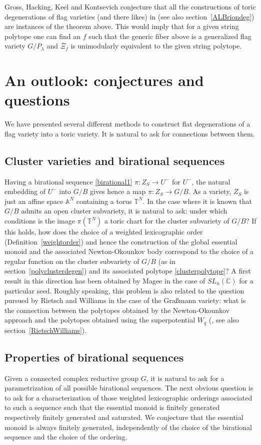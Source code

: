 \documentclass{emsprocart}
\theoremstyle{definition}
\begin{document}
Gross, Hacking, Keel and Kontsevich \cite{GHKK} conjecture that all the constructions of toric degenerations of flag varieties 
(and there likes) in \cite{AB} (see also section~\ref{ALBriondeg}) are instances of the theorem above. 
This would imply that for a given string polytope one can find an $f$ such that the generic
fiber above is a generalized flag variety $G/P_\lambda$ and $\overline \Xi_f$ is unimodularly equivalent to the given string polytope.

\section{An outlook: conjectures and questions}\label{openquestion}
We have presented several different methods to construct flat degenerations of a flag variety into a toric variety.
It is natural to ask for connections between them.
\subsection{Cluster varieties and birational sequences}
Having a birational sequence \eqref{birational1} $\pi:Z_S\rightarrow U^-$ for $U^-$, the natural embedding
of $U^-$ into $G/B$ gives hence a map $\pi:Z_S\rightarrow G/B$. As a variety, $Z_S$ is just an affine space $\mathbb A^N$
containing a torus $\mathbb T^N$. In the case where it is known that $G/B$ admits an open cluster subvariety, it is natural
to ask: under which conditions is the image $\pi(\mathbb T^N)$ a toric chart
for the cluster subvariety of $G/B$? If this holds, how does the choice of a weighted lexicographic order  (Definition~\ref{weightorder})
and hence the construction of the global essential monoid and the associated Newton-Okounkov body
correspond to the choice of a regular function on the cluster subvariety of $G/B$ (as in section~\ref{polyclusterdegen})
and its associated polytope \eqref{clusterpolytope}? 
A first result in this direction has been obtained by Magee \cite{M} in the case of $SL_n(\mathbb C)$
for a particular seed. Roughly speaking, this problem is also related to the 
question pursued by Rietsch and Williams in the case of the Gra\ss mann variety: what is the connection between the polytopes 
obtained by the Newton-Okounkov approach and the polytopes obtained using the superpotential $W_q$ (\cite{RW}, see 
also section~\ref{RietschWilliams}). 

\subsection{Properties of birational sequences}
Given a connected complex reductive group $G$, it is natural to ask
for a parametrization of all possible birational sequences. 
The next obvious question is to ask for a characterization of those
weighted lexicographic orderings associated to such a sequence
such that the essential monoid is finitely generated respectively finitely
generated and saturated. We conjecture that the essential monoid is
always finitely generated, independently of the choice of the birational sequence
and the choice of the ordering.
\end{document}

